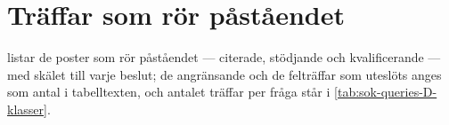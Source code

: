 \section{Träffar som rör påståendet}
\label{sec:komp-traffar}

 listar de poster som rör påståendet ---
citerade, stödjande och kvalificerande --- med skälet till varje beslut;
de angränsande och de felträffar som uteslöts anges som antal i
tabelltexten, och antalet träffar per fråga står i
\cref{tab:sok-queries-D-klasser}.
